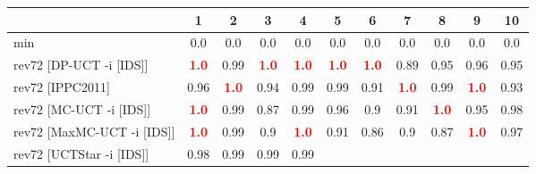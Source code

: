 \documentclass{article}
\begin{document}
\begin{tabular}{|l|r@{$\pm$}rr@{$\pm$}rr@{$\pm$}rr@{$\pm$}rr@{$\pm$}rr@{$\pm$}rr@{$\pm$}rr@{$\pm$}rr@{$\pm$}rr@{$\pm$}r|}
\hline

& \multicolumn{2}{c}{1}
& \multicolumn{2}{c}{2}
& \multicolumn{2}{c}{3}
& \multicolumn{2}{c}{4}
& \multicolumn{2}{c}{5}
& \multicolumn{2}{c}{6}
& \multicolumn{2}{c}{7}
& \multicolumn{2}{c}{8}
& \multicolumn{2}{c}{9}
& \multicolumn{2}{c|}{10}
\\
\hline
\hline
min
& \multicolumn{2}{c}{0.0}
& \multicolumn{2}{c}{0.0}
& \multicolumn{2}{c}{0.0}
& \multicolumn{2}{c}{0.0}
& \multicolumn{2}{c}{0.0}
& \multicolumn{2}{c}{0.0}
& \multicolumn{2}{c}{0.0}
& \multicolumn{2}{c}{0.0}
& \multicolumn{2}{c}{0.0}
& \multicolumn{2}{c|}{0.0}
\\
rev72 [DP-UCT -i [IDS]]
& \multicolumn{2}{c}{\textbf{\textcolor{red}{1.0}}}
& \multicolumn{2}{c}{0.99}
& \multicolumn{2}{c}{\textbf{\textcolor{red}{1.0}}}
& \multicolumn{2}{c}{\textbf{\textcolor{red}{1.0}}}
& \multicolumn{2}{c}{\textbf{\textcolor{red}{1.0}}}
& \multicolumn{2}{c}{\textbf{\textcolor{red}{1.0}}}
& \multicolumn{2}{c}{0.89}
& \multicolumn{2}{c}{0.95}
& \multicolumn{2}{c}{0.96}
& \multicolumn{2}{c|}{0.95}
\\
rev72 [IPPC2011]
& \multicolumn{2}{c}{0.96}
& \multicolumn{2}{c}{\textbf{\textcolor{red}{1.0}}}
& \multicolumn{2}{c}{0.94}
& \multicolumn{2}{c}{0.99}
& \multicolumn{2}{c}{0.99}
& \multicolumn{2}{c}{0.91}
& \multicolumn{2}{c}{\textbf{\textcolor{red}{1.0}}}
& \multicolumn{2}{c}{0.99}
& \multicolumn{2}{c}{\textbf{\textcolor{red}{1.0}}}
& \multicolumn{2}{c|}{0.93}
\\
rev72 [MC-UCT -i [IDS]]
& \multicolumn{2}{c}{\textbf{\textcolor{red}{1.0}}}
& \multicolumn{2}{c}{0.99}
& \multicolumn{2}{c}{0.87}
& \multicolumn{2}{c}{0.99}
& \multicolumn{2}{c}{0.96}
& \multicolumn{2}{c}{0.9}
& \multicolumn{2}{c}{0.91}
& \multicolumn{2}{c}{\textbf{\textcolor{red}{1.0}}}
& \multicolumn{2}{c}{0.95}
& \multicolumn{2}{c|}{0.98}
\\
rev72 [MaxMC-UCT -i [IDS]]
& \multicolumn{2}{c}{\textbf{\textcolor{red}{1.0}}}
& \multicolumn{2}{c}{0.99}
& \multicolumn{2}{c}{0.9}
& \multicolumn{2}{c}{\textbf{\textcolor{red}{1.0}}}
& \multicolumn{2}{c}{0.91}
& \multicolumn{2}{c}{0.86}
& \multicolumn{2}{c}{0.9}
& \multicolumn{2}{c}{0.87}
& \multicolumn{2}{c}{\textbf{\textcolor{red}{1.0}}}
& \multicolumn{2}{c|}{0.97}
\\
rev72 [UCTStar -i [IDS]]
& \multicolumn{2}{c}{0.98}
& \multicolumn{2}{c}{0.99}
& \multicolumn{2}{c}{0.99}
& \multicolumn{2}{c}{0.99}

\end{tabular}
\end{document}
